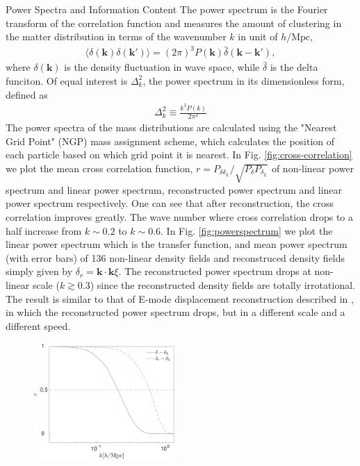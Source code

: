 \begin{section}{Power Spectra and Information Content}
  \label{sec:fisherinfo}
    The power spectrum is the Fourier transform of the correlation function and measures
 the amount of clustering in the matter distribution in terms of the wavenumber
 $k$ in unit of $h/\mathrm{Mpc}$,
\begin{align}
    \langle \delta \left( \bm{k} \right) \delta \left( \bm{k'}\right) \rangle =
\left( 2\pi \right) ^3 P \left( \bm{k} \right) \hat{\delta} \left( \bm{k}-\bm{k'} \right),
\end{align}
where $\delta \left( \bm{k} \right)$ is the density fluctuation in wave space, while 
$\hat{\delta}$ is the delta funciton. Of equal interest is $\Delta ^2_k$, the power 
spectrum in its dimensionless form, defined as
\begin{align}
    \Delta ^2_k \equiv \frac{k^3 P \left( k \right)}{2\pi ^2}
\end{align}
    The power spectra of the mass distributions are calculated using the "Nearest Grid Point" 
(NGP) mass assignment scheme, which calculates the position of each particle based on which 
grid point it is nearest. In Fig. \ref{fig:cross-correlation} we plot the mean cross correlation 
function, $r=P_{\delta \delta_L}/\sqrt{P_\delta P_{\delta_L}}$ of non-linear power spectrum and 
linear power spectrum, reconstructed power spectrum and 
linear power spectrum respectively. One can see that after reconstruction, the cross correlation improves 
greatly. The wave number where cross correlation drops to a half increase from $k\sim 0.2$ to $k \sim 0.6$.
 In Fig. \ref{fig:powerspectrum} we plot the linear power spectrum which is the transfer function, and mean 
power spectrum (with error bars) of 136 non-linear density fields and reconstruced density fields simply 
given by $\delta_r=\bm{k}\cdot\bm{k}\xi$. The reconstructed power spectrum drops at non-linear scale ($k \gtrsim 0.3$) 
since the reconstructed density fields are totally irrotational. The result is similar to that of 
E-mode displacement reconstruction described in \cite{bib:Yu2016}, in which the reconstructed power spectrum 
drops, but in a different scale and a different speed.
\begin{figure}[t!]
\centering
\includegraphics[width=0.48\textwidth]{cross-correlation_analysis-crop.pdf}

\end{figure}
\end{section}
